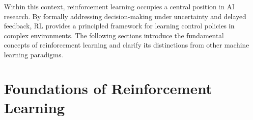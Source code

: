 Within this context, reinforcement learning occupies a central position in AI research. By formally addressing decision-making under uncertainty and delayed feedback, RL provides a principled framework for learning control policies in complex environments. The following sections introduce the fundamental concepts of reinforcement learning and clarify its distinctions from other machine learning paradigms.











\section{Foundations of Reinforcement Learning}


